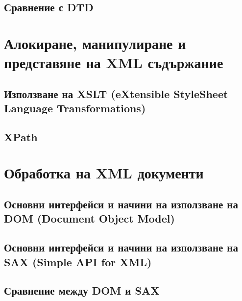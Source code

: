 \documentclass[fleqn,12pt]{article}
\begin{document}
\subsection{Сравнение с DTD}

\section{Алокиране, манипулиране и представяне на XML съдържание}

\subsection{Използване на XSLT (eXtensible StyleSheet Language Transformations)}
\subsection{XPath}

\section{Обработка на XML документи}

\subsection{Основни интерфейси и начини на използване на DOM (Document Object Model)}
\subsection{Основни интерфейси и начини на използване на SAX (Simple API for XML)}
\subsection{Сравнение между DOM и SAX}
\end{document}
